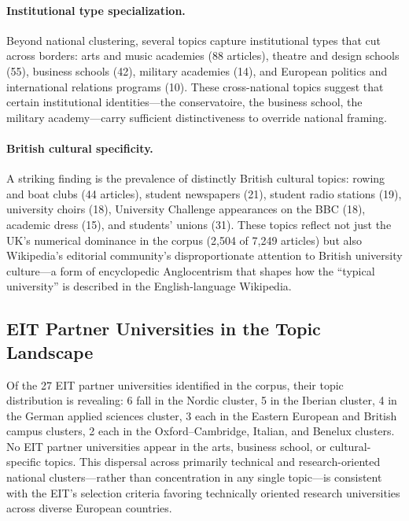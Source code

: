 \documentclass[../main.tex]{subfiles}
\begin{document}
\paragraph{Institutional type specialization.}
Beyond national clustering, several topics capture institutional types that
cut across borders: arts and music academies (88 articles), theatre and design
schools (55), business schools (42), military academies (14), and
European politics and international relations programs (10). These
cross-national topics suggest that certain institutional identities---the
conservatoire, the business school, the military academy---carry sufficient
distinctiveness to override national framing.

\paragraph{British cultural specificity.}
A striking finding is the prevalence of distinctly British cultural
topics: rowing and boat clubs (44 articles), student newspapers (21),
student radio stations (19), university choirs (18), University Challenge
appearances on the BBC (18), academic dress (15), and students' unions (31).
These topics reflect not just the UK's numerical dominance in the corpus
(2,504 of 7,249 articles) but also Wikipedia's editorial community's
disproportionate attention to British university culture---a form of
encyclopedic Anglocentrism that shapes how the ``typical university'' is
described in the English-language Wikipedia.

\subsection*{EIT Partner Universities in the Topic Landscape}

Of the 27 EIT partner universities identified in the corpus, their topic
distribution is revealing: 6 fall in the Nordic cluster, 5 in the Iberian
cluster, 4 in the German applied sciences cluster, 3 each in the Eastern
European and British campus clusters, 2 each in the Oxford--Cambridge,
Italian, and Benelux clusters. No EIT partner universities appear in
the arts, business school, or cultural-specific topics. This dispersal
across primarily technical and research-oriented national clusters---rather
than concentration in any single topic---is consistent with the EIT's
selection criteria favoring technically oriented research universities
across diverse European countries.


\end{document}
